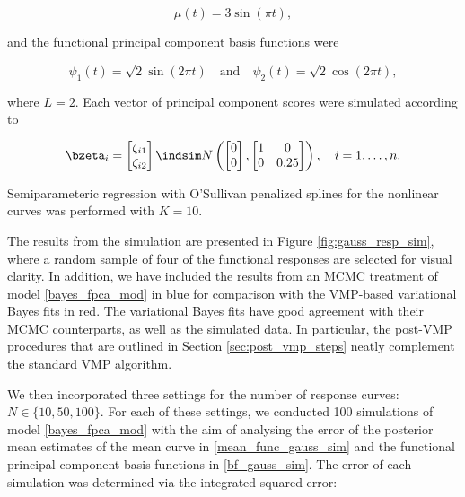 \documentclass[12pt]{article}
\theoremstyle{plain}
\theoremstyle{definition}
\theoremstyle{remark}
\begin{document}
\begin{equation}
	\mu (t) = 3 \sin (\pi t),
\label{mean_func_gauss_sim}
\end{equation}

\noindent and the functional principal component basis functions were

\begin{equation}
	\psi_1 (t) = \sqrt{2} \sin (2 \pi t) \quad
	\text{and} \quad
	\psi_2 (t) = \sqrt{2} \cos (2 \pi t),
\label{bf_gauss_sim}
\end{equation}

\noindent where $L = 2$. Each vector of principal component scores were simulated according to

\begin{equation}
	\bzeta_i = \begin{bmatrix}
		\zeta_{i1} \\
		\zeta_{i2}
	\end{bmatrix} \indsim N \left(
		\begin{bmatrix}
			0 \\
			0
		\end{bmatrix},
		\begin{bmatrix}
			1 & 0 \\
			0 & 0.25
		\end{bmatrix}
	\right), \quad i = 1, \dots, n.
\label{score_sims}
\end{equation}

\noindent Semiparameteric regression with O'Sullivan penalized splines for the nonlinear curves was performed
with $K = 10$.

The results from the simulation are presented in Figure \ref{fig:gauss_resp_sim}, where a random sample of
four of the functional responses are selected for visual clarity. In addition, we have included the results from an MCMC
treatment of model \eqref{bayes_fpca_mod} in blue for comparison with
the VMP-based variational Bayes fits in red. The variational Bayes fits have good agreement with their MCMC
counterparts, as well as the simulated data.
In particular, the post-VMP procedures that are outlined in Section \ref{sec:post_vmp_steps} neatly
complement the standard VMP algorithm.

We then incorporated three settings for the number of response curves: $N \in \{ 10, 50, 100 \}$. For each of these
settings, we conducted 100 simulations of model \eqref{bayes_fpca_mod} with the aim of analysing the error of
the posterior mean estimates of the mean curve in \eqref{mean_func_gauss_sim} and the functional principal
component basis functions in \eqref{bf_gauss_sim}. The error of each simulation was determined via the
integrated squared error:
\end{document}
